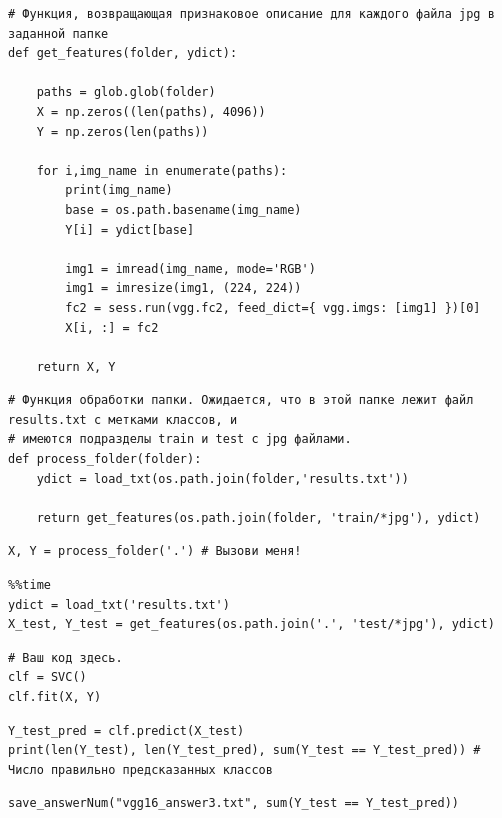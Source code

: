 \documentclass[11pt,a4paper]{article}
\begin{document}
\begin{verbatim}
# Функция, возвращающая признаковое описание для каждого файла jpg в заданной папке
def get_features(folder, ydict):

    paths = glob.glob(folder)
    X = np.zeros((len(paths), 4096))
    Y = np.zeros(len(paths))

    for i,img_name in enumerate(paths):
        print(img_name)
        base = os.path.basename(img_name)
        Y[i] = ydict[base]

        img1 = imread(img_name, mode='RGB')
        img1 = imresize(img1, (224, 224))
        fc2 = sess.run(vgg.fc2, feed_dict={ vgg.imgs: [img1] })[0]
        X[i, :] = fc2
    
    return X, Y
\end{verbatim}

\begin{verbatim}
# Функция обработки папки. Ожидается, что в этой папке лежит файл results.txt с метками классов, и 
# имеются подразделы train и test с jpg файлами.
def process_folder(folder):
    ydict = load_txt(os.path.join(folder,'results.txt'))
    
    return get_features(os.path.join(folder, 'train/*jpg'), ydict)
\end{verbatim}

\begin{verbatim}
X, Y = process_folder('.') # Вызови меня!
\end{verbatim}

\begin{verbatim}
%%time
ydict = load_txt('results.txt')
X_test, Y_test = get_features(os.path.join('.', 'test/*jpg'), ydict)
\end{verbatim}

\begin{verbatim}
# Ваш код здесь. 
clf = SVC()
clf.fit(X, Y)
\end{verbatim}

\begin{verbatim}
Y_test_pred = clf.predict(X_test)
print(len(Y_test), len(Y_test_pred), sum(Y_test == Y_test_pred)) # Число правильно предсказанных классов
\end{verbatim}

\begin{verbatim}
save_answerNum("vgg16_answer3.txt", sum(Y_test == Y_test_pred))
\end{verbatim}
\end{document}
